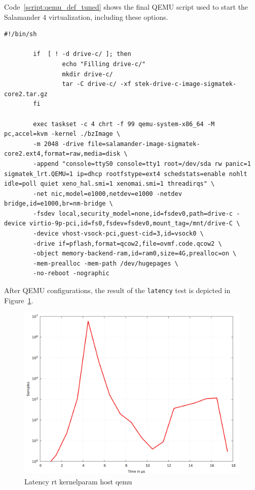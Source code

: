 \documentclass[MMR,Master,english]{twbook}
\begin{document}
\noindent Code~\ref{script:qemu_def_tuned} shows the final QEMU script used to start the Salamander 4 virtualization, including these options.
\clearpage
\vspace{2em}
\begin{lstlisting}[name={Tuned QEMU script for starting Salamander 4 virtualization},label={script:qemu_def_tuned}]
		#!/bin/sh

		if  [ ! -d drive-c/ ]; then
				echo "Filling drive-c/"
				mkdir drive-c/
				tar -C drive-c/ -xf stek-drive-c-image-sigmatek-core2.tar.gz
		fi
			
		exec taskset -c 4 chrt -f 99 qemu-system-x86_64 -M pc,accel=kvm -kernel ./bzImage \
		-m 2048 -drive file=salamander-image-sigmatek-core2.ext4,format=raw,media=disk \
		-append "console=ttyS0 console=tty1 root=/dev/sda rw panic=1 sigmatek_lrt.QEMU=1 ip=dhcp rootfstype=ext4 schedstats=enable nohlt idle=poll quiet xeno_hal.smi=1 xenomai.smi=1 threadirqs" \
		-net nic,model=e1000,netdev=e1000 -netdev bridge,id=e1000,br=nm-bridge \
		-fsdev local,security_model=none,id=fsdev0,path=drive-c -device virtio-9p-pci,id=fs0,fsdev=fsdev0,mount_tag=/mnt/drive-C \
		-device vhost-vsock-pci,guest-cid=3,id=vsock0 \
		-drive if=pflash,format=qcow2,file=ovmf.code.qcow2 \
		-object memory-backend-ram,id=ram0,size=4G,prealloc=on \
		-mem-prealloc -mem-path /dev/hugepages \
		-no-reboot -nographic
	\end{lstlisting}
\vspace{2em}
	\noindent After QEMU configurations, the result of the \texttt{latency} test is depicted in Figure~\ref{fig:max_latency_rt_kernelparam_host_qemu}. 


\begin{figure}[H]
	\centering
	\includegraphics[width=0.7\columnwidth]{masterthesis-documentation/docs/sigmatek/xenomai/6rt_kernelparam_host_qemu/gnuplot_max_latency_rt_kernelparam_host_qemu.png}
	\caption[Latency rt kernelparam host qemu]{Latency rt kernelparam host qemu}
	\label{fig:max_latency_rt_kernelparam_host_qemu}
\end{figure}
\end{document}
